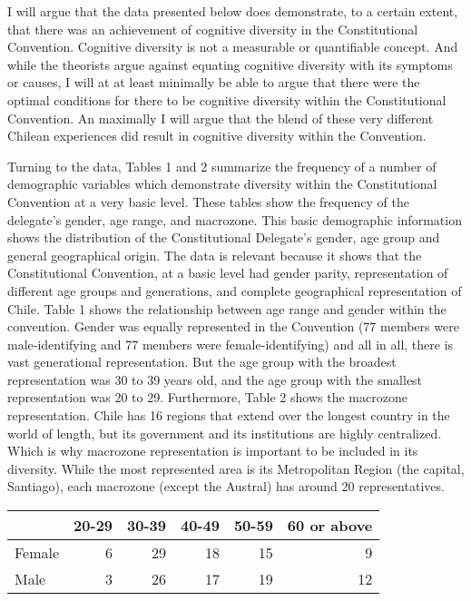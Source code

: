 \documentclass[
]{article}
\begin{document}
I will argue that the data presented below does demonstrate, to a
certain extent, that there was an achievement of cognitive diversity in
the Constitutional Convention. Cognitive diversity is not a measurable
or quantifiable concept. And while the theorists argue against equating
cognitive diversity with its symptoms or causes, I will at at least
minimally be able to argue that there were the optimal conditions for
there to be cognitive diversity within the Constitutional Convention. An
maximally I will argue that the blend of these very different Chilean
experiences did result in cognitive diversity within the Convention.

Turning to the data, Tables 1 and 2 summarize the frequency of a number
of demographic variables which demonstrate diversity within the
Constitutional Convention at a very basic level. These tables show the
frequency of the delegate's gender, age range, and macrozone. This basic
demographic information shows the distribution of the Constitutional
Delegate's gender, age group and general geographical origin. The data
is relevant because it shows that the Constitutional Convention, at a
basic level had gender parity, representation of different age groups
and generations, and complete geographical representation of Chile.
Table 1 shows the relationship between age range and gender within the
convention. Gender was equally represented in the Convention (77 members
were male-identifying and 77 members were female-identifying) and all in
all, there is vast generational representation. But the age group with
the broadest representation was 30 to 39 years old, and the age group
with the smallest representation was 20 to 29. Furthermore, Table 2
shows the macrozone representation. Chile has 16 regions that extend
over the longest country in the world of length, but its government and
its institutions are highly centralized. Which is why macrozone
representation is important to be included in its diversity. While the
most represented area is its Metropolitan Region (the capital,
Santiago), each macrozone (except the Austral) has around 20
representatives.

\begin{longtable}[]{@{}lrrrrr@{}}
\toprule()
& 20-29 & 30-39 & 40-49 & 50-59 & 60 or above \\
\midrule()
\endhead
Female & 6 & 29 & 18 & 15 & 9 \\
Male & 3 & 26 & 17 & 19 & 12 \\
\bottomrule()
\end{longtable}
\end{document}
